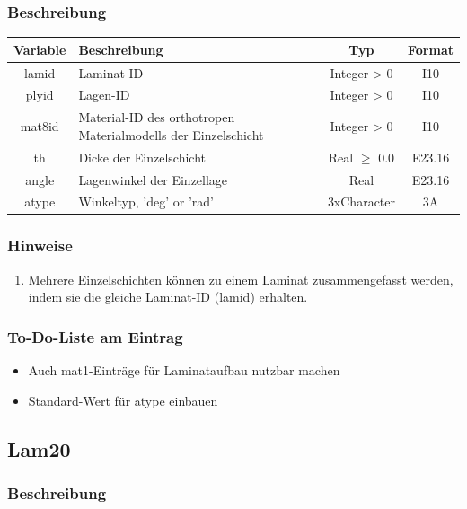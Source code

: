 \documentclass[11pt,titlepage,listof=totoc,bibliography=totoc,twoside]{scrreprt}
\begin{document}
{{\subsubsection{Beschreibung}

\begin{tabularx}{\textwidth}{cXcc}
\toprule
Variable& Beschreibung							& Typ			& Format\\
\midrule
lamid	& Laminat-ID							& Integer > 0	& I10	\\
plyid	& Lagen-ID							& Integer > 0	& I10	\\
mat8id	& Material-ID des orthotropen Materialmodells der Einzelschicht	& Integer > 0	& I10	\\
th	& Dicke der Einzelschicht					& Real $\ge$ 0.0& E23.16\\
angle	& Lagenwinkel der Einzellage					& Real			& E23.16\\
atype	& Winkeltyp, 'deg' or 'rad'					& 3xCharacter	& 3A	\\
\bottomrule
\end{tabularx}

\subsubsection{Hinweise}

\begin{enumerate}
\item Mehrere Einzelschichten können zu einem Laminat zusammengefasst werden, indem sie die gleiche Laminat-ID (lamid) erhalten.
\end{enumerate}

\subsubsection{To-Do-Liste am Eintrag}

\begin{itemize}
\item Auch mat1-Einträge für Laminataufbau nutzbar machen
\item Standard-Wert für atype einbauen
\end{itemize}

\newpage

\subsection{Lam20}

\subsubsection{Beschreibung}

}}
\end{document}
